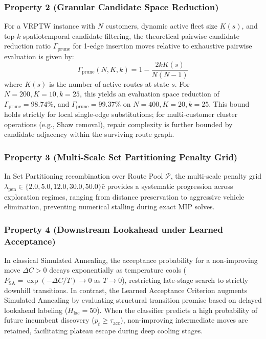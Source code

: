 \subsubsection{Property 2 (Granular Candidate Space Reduction)}
\label{prop:granular_pruning}
For a VRPTW instance with $N$ customers, dynamic active fleet size $K(s)$, and top-$k$ spatiotemporal candidate filtering, the theoretical pairwise candidate reduction ratio $\Gamma_{\text{prune}}$ for 1-edge insertion moves relative to exhaustive pairwise evaluation is given by:
\begin{equation}
  \Gamma_{\text{prune}}(N, K, k) = 1 - \frac{2 k K(s)}{N(N-1)}
  \label{eq:prop_pruning}
\end{equation}
where $K(s)$ is the number of active routes at state $s$. For $N=200, K=10, k=25$, this yields an evaluation space reduction of $\Gamma_{\text{prune}} = 98.74\%$, and $\Gamma_{\text{prune}} = 99.37\%$ on $N=400, K=20, k=25$. This bound holds strictly for local single-edge substitutions; for multi-customer cluster operations (e.g., Shaw removal), repair complexity is further bounded by candidate adjacency within the surviving route graph.

\subsubsection{Property 3 (Multi-Scale Set Partitioning Penalty Grid)}
\label{prop:penalty_floor}
In Set Partitioning recombination over Route Pool $\mathcal{P}$, the multi-scale penalty grid $\lambda_{\text{pen}} \in \{2.0, 5.0, 12.0, 30.0, 50.0\}\bar{c}$ provides a systematic progression across exploration regimes, ranging from distance preservation to aggressive vehicle elimination, preventing numerical stalling during exact MIP solves.

\subsubsection{Property 4 (Downstream Lookahead under Learned Acceptance)}
\label{prop:lac_behavior}
In classical Simulated Annealing, the acceptance probability for a non-improving move $\Delta C > 0$ decays exponentially as temperature cools ($P_{\text{SA}} = \exp(-\Delta C / T) \to 0$ as $T \to 0$), restricting late-stage search to strictly downhill transitions. In contrast, the Learned Acceptance Criterion augments Simulated Annealing by evaluating structural transition promise based on delayed lookahead labeling ($H_{\text{lac}} = 50$). When the classifier predicts a high probability of future incumbent discovery ($p_t \ge \tau_{\text{acc}}$), non-improving intermediate moves are retained, facilitating plateau escape during deep cooling stages.


